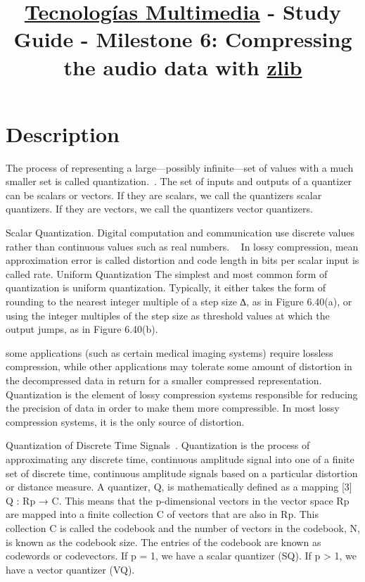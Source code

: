 \title{\href{https://www.ual.es/estudios/grados/presentacion/plandeestudios/asignatura/4015/40154321?idioma=zh_CN}{Tecnologías Multimedia} - Study Guide - Milestone 6: Compressing the audio data with \href{https://zlib.net/}{zlib}}

\maketitle

\section{Description}

The process of representing a large—possibly infinite—set of values with a much smaller
set is called quantization.~\cite{sayood}. The set of inputs and outputs of a quantizer can be scalars or vectors. If they are
scalars, we call the quantizers scalar quantizers. If they are vectors, we call the quantizers
vector quantizers.

Scalar Quantization. Digital computation and communication use discrete values rather than continuous
values such as real numbers. ~\cite{foundationsofsignalprocessing} In lossy compression, mean approximation error is called distortion and code
length in bits per scalar input is called rate. Uniform Quantization The simplest and most common form of quantization is
uniform quantization. Typically, it either takes the form of rounding to the nearest
integer multiple of a step size ∆, as in Figure 6.40(a), or using the integer multiples
of the step size as threshold values at which the output jumps, as in Figure 6.40(b).

some applications
(such as certain medical imaging systems) require lossless compression,
while other applications may tolerate some amount of distortion in the
decompressed data in return for a smaller compressed representation.
Quantization is the element of lossy compression systems responsible for
reducing the precision of data in order to make them more compressible.
In most lossy compression systems, it is the only source of distortion.~\cite{taubman}

Quantization of Discrete Time
Signals~\cite{digitalsignalprocessinghandbook}. Quantization is the process of approximating any discrete time, continuous
amplitude signal into one of a finite set of discrete time, continuous amplitude signals based on a
particular distortion or distance measure. A quantizer, Q, is mathematically defined as a mapping [3] Q : Rp → C. This means that the
p-dimensional vectors in the vector space Rp are mapped into a finite collection C of vectors that are
also in Rp. This collection C is called the codebook and the number of vectors in the codebook, N,
is known as the codebook size. The entries of the codebook are known as codewords or codevectors.
If p = 1, we have a scalar quantizer (SQ). If p > 1, we have a vector quantizer (VQ).

